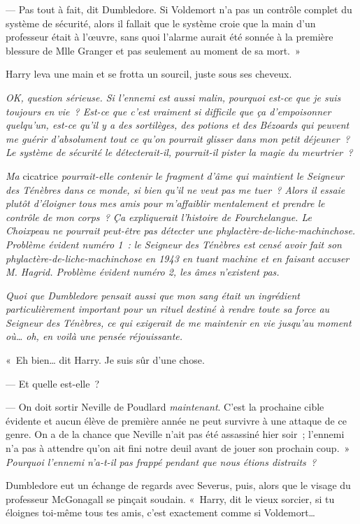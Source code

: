 --- Pas tout à fait, dit Dumbledore.
Si Voldemort n'a pas un contrôle complet du système de sécurité, alors il fallait que le système croie que la main d'un professeur était à l'œuvre, sans quoi l'alarme aurait été sonnée à la première blessure de Mlle Granger et pas seulement au moment de sa mort.~»

Harry leva une main et se frotta un sourcil, juste sous ses cheveux.

\emph{OK, question sérieuse.
Si l'ennemi est aussi malin, pourquoi est-ce que je suis toujours en vie~?
Est-ce que c'est vraiment si difficile que ça d'empoisonner quelqu'un, est-ce qu'il y a des sortilèges, des potions et des Bézoards qui peuvent me guérir d'absolument tout ce qu'on pourrait glisser dans mon petit déjeuner~?
Le système de sécurité le détecterait-il, pourrait-il pister la magie du meurtrier~?}

\emph{Ma} cicatrice \emph{pourrait-elle contenir le fragment d'âme qui maintient le Seigneur des Ténèbres dans ce monde, si bien qu'il ne veut pas me tuer~?
Alors il essaie plutôt d'éloigner tous mes amis pour m'affaiblir mentalement et prendre le contrôle de mon corps~?
Ça expliquerait l'histoire de Fourchelangue.
Le Choixpeau ne pourrait peut-être pas détecter une phylactère-de-liche-machinchose.
Problème évident numéro 1~: le Seigneur des Ténèbres est censé avoir fait son phylactère-de-liche-machinchose en 1943 en tuant machine et en faisant accuser M. Hagrid.
Problème évident numéro 2, les âmes n'existent pas.}

\emph{Quoi que Dumbledore pensait aussi que mon sang était un ingrédient particulièrement important pour un rituel destiné à rendre toute sa force au Seigneur des Ténèbres, ce qui exigerait de me maintenir en vie jusqu'au moment où… oh, en voilà une pensée réjouissante.}

«~Eh bien… dit Harry.
Je suis sûr d'une chose.

--- Et quelle est-elle~?

--- On doit sortir Neville de Poudlard \emph{maintenant}.
C'est la prochaine cible évidente et aucun élève de première année ne peut survivre à une attaque de ce genre.
On a de la chance que Neville n'ait pas été assassiné hier soir~; l'ennemi n'a pas à attendre qu'on ait fini notre deuil avant de jouer son prochain coup.~»
\emph{Pourquoi l'ennemi n'a-t-il pas frappé pendant que nous étions distraits~?}

Dumbledore eut un échange de regards avec Severus, puis, alors que le visage du professeur McGonagall se pinçait soudain.
«~Harry, dit le vieux sorcier, si tu éloignes toi-même tous tes amis, c'est exactement comme si Voldemort…


